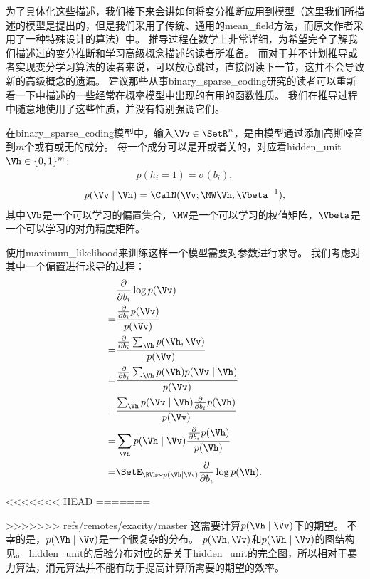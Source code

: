 为了具体化这些描述，我们接下来会讲如何将变分推断应用到模型（这里我们所描述的模型是\citet{henniges2010binary}提出的，但是我们采用了传统、通用的\gls{mean_field}方法，而原文作者采用了一种特殊设计的算法）中。
推导过程在数学上非常详细，为希望完全了解我们描述过的变分推断和学习高级概念描述的读者所准备。
而对于并不计划推导或者实现变分学习算法的读者来说，可以放心跳过，直接阅读下一节，这并不会导致新的高级概念的遗漏。
建议那些从事\gls{binary_sparse_coding}研究的读者可以重新看一下中描述的一些经常在概率模型中出现的有用的函数性质。
我们在推导过程中随意地使用了这些性质，并没有特别强调它们。


在\gls{binary_sparse_coding}模型中，输入$\Vv\in\SetR^n$，是由模型通过添加高斯噪音到$m$个或有或无的成分。
每一个成分可以是开或者关的，对应着\gls{hidden_unit} $\Vh \in\{0,1\}^m$:
\begin{align}
	p(h_i = 1) = \sigma(b_i),
\end{align}
\begin{align}
	p(\Vv\mid\Vh) = \CalN(\Vv;\MW \Vh,{\Vbeta}^{-1}),
\end{align}
其中$\Vb$是一个可以学习的偏置集合，$\MW$是一个可以学习的权值矩阵，${\Vbeta}$是一个可以学习的对角精度矩阵。


使用\gls{maximum_likelihood}来训练这样一个模型需要对参数进行求导。
我们考虑对其中一个偏置进行求导的过程：
\begin{align}
		& \frac{\partial}{\partial b_i} \log p(\Vv) \\
		= &  \frac{\frac{\partial}{\partial b_i} p(\Vv)}{p(\Vv)}\\
		= & \frac{\frac{\partial}{\partial b_i} \sum_{\Vh}^{} p(\Vh,\Vv)}{p(\Vv)}\\
		= &  \frac{\frac{\partial}{\partial b_i} \sum_{\Vh}^{} p(\Vh) p(\Vv\mid \Vh)  }{p(\Vv)}\\
		= &  \frac{ \sum_{\Vh}^{}  p(\Vv\mid \Vh) \frac{\partial}{\partial b_i} p(\Vh) }{p(\Vv)}\\
		= &  \sum_{\Vh}^{}  p(\Vh\mid \Vv) \frac{  \frac{\partial}{\partial b_i} p(\Vh) }{p(\Vh)}\\
		= & \SetE_{\RVh\sim p(\Vh\mid\Vv)} \frac{\partial}{\partial b_i}\log p(\Vh).
\end{align}

<<<<<<< HEAD
=======

>>>>>>> refs/remotes/exacity/master
这需要计算$p(\Vh\mid\Vv)$下的期望。
不幸的是，$p(\Vh\mid\Vv)$是一个很复杂的分布。
$p(\Vh,\Vv)$和$p(\Vh\mid\Vv)$的图结构见。
\gls{hidden_unit}的后验分布对应的是关于\gls{hidden_unit}的完全图，所以相对于暴力算法，消元算法并不能有助于提高计算所需要的期望的效率。


